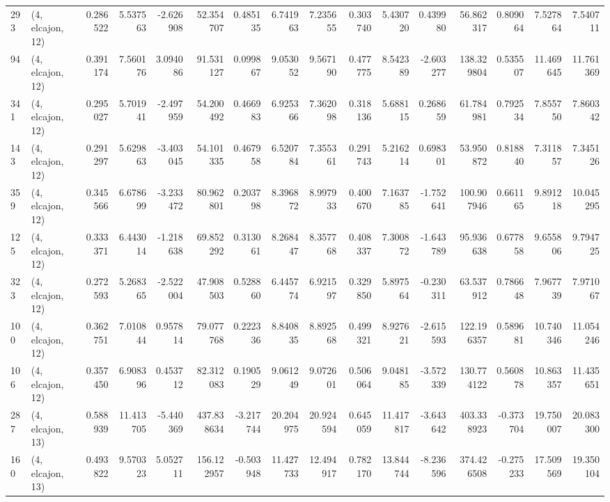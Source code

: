 \begin{tabular}{llrrrrrrrrrrrrrr}
293 &  (4, elcajon, 12) &   0.286522 &   5.537563 &  -2.626908 &    52.354707 &   0.485135 &   6.741963 &   7.235655 &  0.303740 &   5.430720 &   0.439980 &    56.862317 &  0.809064 &   7.527864 &   7.540711 \\
94  &  (4, elcajon, 12) &   0.391174 &   7.560176 &   3.094086 &    91.531127 &   0.099867 &   9.053052 &   9.567190 &  0.477775 &   8.542389 &  -2.603277 &   138.329804 &  0.535507 &  11.469645 &  11.761369 \\
341 &  (4, elcajon, 12) &   0.295027 &   5.701941 &  -2.497959 &    54.200492 &   0.466983 &   6.925366 &   7.362098 &  0.318136 &   5.688115 &   0.268659 &    61.784981 &  0.792534 &   7.855750 &   7.860342 \\
143 &  (4, elcajon, 12) &   0.291297 &   5.629863 &  -3.403045 &    54.101335 &   0.467958 &   6.520784 &   7.355361 &  0.291743 &   5.216214 &   0.698301 &    53.950872 &  0.818840 &   7.311857 &   7.345126 \\
359 &  (4, elcajon, 12) &   0.345566 &   6.678699 &  -3.233472 &    80.962801 &   0.203798 &   8.396872 &   8.997933 &  0.400670 &   7.163785 &  -1.752641 &   100.907946 &  0.661165 &   9.891218 &  10.045295 \\
125 &  (4, elcajon, 12) &   0.333371 &   6.443014 &  -1.218638 &    69.852292 &   0.313061 &   8.268447 &   8.357768 &  0.408337 &   7.300872 &  -1.643789 &    95.936638 &  0.677858 &   9.655806 &   9.794725 \\
323 &  (4, elcajon, 12) &   0.272593 &   5.268365 &  -2.522004 &    47.908503 &   0.528860 &   6.445774 &   6.921597 &  0.329850 &   5.897564 &  -0.230311 &    63.537912 &  0.786648 &   7.967739 &   7.971067 \\
100 &  (4, elcajon, 12) &   0.362751 &   7.010844 &   0.957814 &    79.077768 &   0.222336 &   8.840835 &   8.892568 &  0.499321 &   8.927621 &  -2.615593 &   122.196357 &  0.589681 &  10.740346 &  11.054246 \\
106 &  (4, elcajon, 12) &   0.357450 &   6.908396 &   0.453712 &    82.312083 &   0.190529 &   9.061249 &   9.072601 &  0.506064 &   9.048185 &  -3.572339 &   130.774122 &  0.560878 &  10.863357 &  11.435651 \\
287 &  (4, elcajon, 13) &   0.588939 &  11.413705 &  -5.440369 &   437.838634 &  -3.217744 &  20.204975 &  20.924594 &  0.645059 &  11.417817 &  -3.643642 &   403.338923 & -0.373704 &  19.750007 &  20.083300 \\
160 &  (4, elcajon, 13) &   0.493822 &   9.570323 &   5.052711 &   156.122957 &  -0.503948 &  11.427733 &  12.494917 &  0.782170 &  13.844744 &  -8.236596 &   374.426508 & -0.275233 &  17.509569 &  19.350104 \\

\end{tabular}
